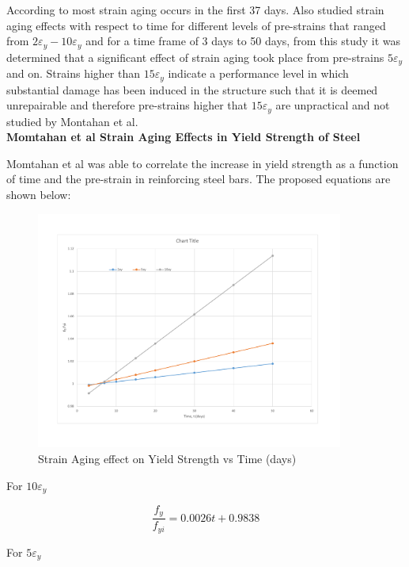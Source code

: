 According to \cite{Restrepo-Posada1994} most strain aging occurs in the first 37 days. Also \cite{Momtahan2009} studied strain aging effects with respect to time for different levels of pre-strains that ranged from $2\varepsilon_y - 10\varepsilon_y$ and for a time frame of 3 days to 50 days, from this study it was determined that a significant effect of strain aging took place from pre-strains $5\varepsilon_y$ and on. Strains higher than $15\varepsilon_y$ indicate a performance level in which substantial damage has been induced in the structure such that it is deemed unrepairable and therefore pre-strains higher that $15\varepsilon_y$ are unpractical and not studied by Montahan et al\cite{Momtahan2009}.
\\
\textbf{Momtahan et al Strain Aging Effects in Yield Strength of Steel}

Momtahan et al was able to correlate the increase in yield strength as a function of time and the pre-strain in reinforcing steel bars. The proposed equations are shown below:

\begin{figure}[htbp]
\centering
\includegraphics[width=0.9\textwidth]{Chapter-1/figs/StrainAging_TimeDependent}
\caption{Strain Aging effect on Yield Strength vs Time (days)}
\label{fig:hist4}
\end{figure}


For $10\varepsilon_y$

\begin{equation}
  \frac{f_y}{f_{yi}}=0.0026t+0.9838
  \label{eq.nine}
\end{equation} 

For $5\varepsilon_y$

